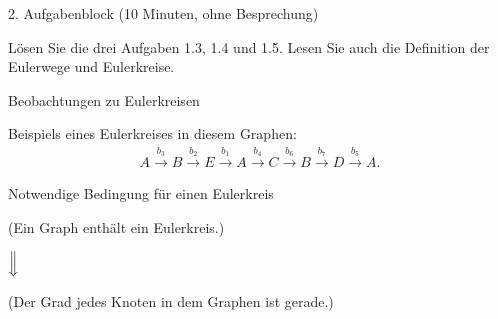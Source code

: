 \begin{frame}[fragile]{2. Aufgabenblock (10 Minuten, ohne Besprechung)}
\begin{center}
    Lösen Sie die drei Aufgaben 1.3, 1.4 und 1.5. Lesen Sie auch die Definition der Eulerwege und Eulerkreise.
\end{center}
\end{frame}


\begin{frame}[fragile]{Beobachtungen zu Eulerkreisen}
\begin{figure}[H]
     \centering
{}%
\end{figure}
\noindent
Beispiels eines Eulerkreises in diesem Graphen:
    \begin{align*}
        A \stackrel{b_3}{\longrightarrow} B \stackrel{b_2}{\longrightarrow} E 
        \stackrel{b_1}{\longrightarrow} A \stackrel{b_4}{\longrightarrow}  C \stackrel{b_6}{\longrightarrow} B
        \stackrel{b_7}{\longrightarrow} D \stackrel{b_5}{\longrightarrow} A.
    \end{align*}
\end{frame}


\begin{frame}[fragile]{Notwendige Bedingung für einen Eulerkreis}
\centering
\begin{center}
    (Ein Graph enthält ein Eulerkreis.)
\end{center}
$\Big\Downarrow$\\
\begin{center}
    (Der Grad jedes Knoten in dem Graphen ist gerade.)
\end{center}
\end{frame}


